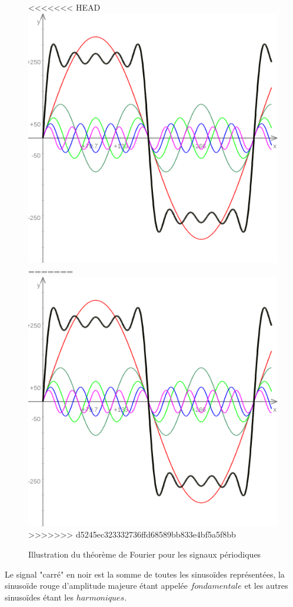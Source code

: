 \begin{figure}[!h]
\centering
<<<<<<< HEAD
\includegraphics[scale=0.2]{sinusoides.png}
=======
\includegraphics[scale=0.2]{images/sinusoides.png}
>>>>>>> d5245ec323332736ffd68589bb833e4bf5a5f8bb
\caption{Illustration du théorème de Fourier pour les signaux périodiques}
\end{figure}
Le signal "carré" en noir est la somme de toutes les sinusoïdes représentées, la sinusoïde rouge d'amplitude majeure étant appelée $\mathit{fondamentale}$ et les autres sinusoïdes étant les $\mathit{harmoniques}$. \\


